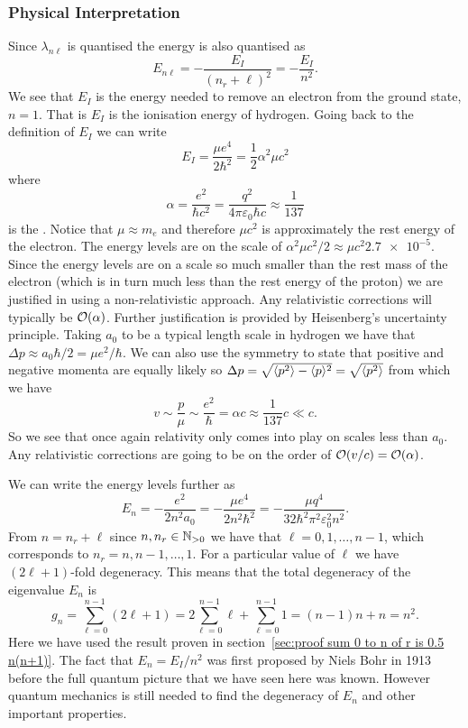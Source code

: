 \documentclass[a4paper]{article}
\theoremstyle{definition}
\begin{document}
    \subsubsection{Physical Interpretation}
    Since \(\lambda_{n\ell}\) is quantised the energy is also quantised as
    \[E_{n\ell} = -\frac{E_I}{(n_r + \ell)^2} = -\frac{E_I}{n^2}.\]
    We see that \(E_I\) is the energy needed to remove an electron from the ground state, \(n = 1\).
    That is \(E_I\) is the ionisation energy of hydrogen.
    Going back to the definition of \(E_I\) we can write
    \[E_I = \frac{\mu e^4}{2\hbar^2} = \frac{1}{2}\alpha^2\mu c^2\]
    where
    \[\alpha = \frac{e^2}{\hbar c^2} = \frac{q^2}{4\pi\varepsilon_0\hbar c} \approx \frac{1}{137}\]
    is the .
    Notice that \(\mu \approx m_e\) and therefore \(\mu c^2\) is approximately the rest energy of the electron.
    The energy levels are on the scale of \(\alpha^2\mu c^2/2 \approx \mu c^2 \num{2.7e-5}\).
    Since the energy levels are on a scale so much smaller than the rest mass of the electron (which is in turn much less than the rest energy of the proton) we are justified in using a non-relativistic approach.
    Any relativistic corrections will typically be \(\order{\alpha}\).
    Further justification is provided by Heisenberg's uncertainty principle.
    Taking \(a_0\) to be a typical length scale in hydrogen we have that \(\Delta p \approx a_0\hbar/2 = \mu e^2/\hbar\).
    We can also use the symmetry to state that positive and negative momenta are equally likely so \(\Delta p = \sqrt{\langle{p^2}\rangle - \langle{p}\rangle^2} = \sqrt{\langle{p^2}\rangle}\) from which we have
    \[v \sim \frac{p}{\mu} \sim \frac{e^2}{\hbar} = \alpha c \approx \frac{1}{137}c \ll c.\]
    So we see that once again relativity only comes into play on scales less than \(a_0\).
    Any relativistic corrections are going to be on the order of \(\order{v/c} = \order{\alpha}\).
    
    We can write the energy levels further as
    \[E_n = -\frac{e^2}{2n^2a_0} = -\frac{\mu e^4}{2n^2\hbar^2} = -\frac{\mu q^4}{32\hbar^2\pi^2\varepsilon_0^2n^2}.\]
    From \(n = n_r + \ell\) since \(n, n_r\in\mathbb{N}_{>0}\) we have that \(\ell = 0, 1, \dotsc, n - 1\), which corresponds to \(n_r = n, n-1, \dotsc, 1\).
    For a particular value of \(\ell\) we have \((2\ell + 1)\)-fold degeneracy.
    This means that the total degeneracy of the eigenvalue \(E_n\) is
    \[g_n = \sum_{\ell = 0}^{n - 1}(2\ell + 1) = 2\sum_{\ell=0}^{n-1}\ell + \sum_{\ell=0}^{n-1}1 = (n - 1)n + n = n^2.\]
    Here we have used the result proven in section~\ref{sec:proof sum 0 to n of r is 0.5 n(n+1)}.
    The fact that \(E_n = E_I/n^2\) was first proposed by Niels Bohr in 1913 before the full quantum picture that we have seen here was known.
    However quantum mechanics is still needed to find the degeneracy of \(E_n\) and other important properties.
    
\end{document}
